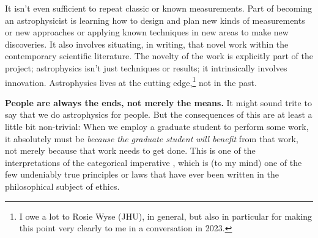 \documentclass{article}
\newcommand{\paragraphskip}{\medskip}
\renewcommand{\paragraph}[1]{\par\paragraphskip\noindent\textbf{#1}}
\begin{document}
It isn't even sufficient to repeat classic or known measurements.
Part of becoming an astrophysicist is learning how to design and plan new kinds of measurements or new approaches or applying known techniques in new areas to make new discoveries.
It also involves situating, in writing, that novel work within the contemporary scientific literature.
The novelty of the work is explicitly part of the project; astrophysics isn't just techniques or results; it intrinsically involves innovation.
Astrophysics lives at the cutting edge,\footnote{%
I owe a lot to Rosie Wyse (JHU), in general, but also in particular for making this point very clearly to me in a conversation in 2023.}
not in the past.

\paragraph{People are always the ends, not merely the means.}
It might sound trite to say that we do astrophysics for people.
But the consequences of this are at least a little bit non-trivial:
When we employ a graduate student to perform some work, it absolutely must be \emph{because the graduate student will benefit} from that work, not merely because that work needs to get done.
This is one of the interpretations of the categorical imperative \cite{kant}, which is (to my mind) one of the few undeniably true principles or laws that have ever been written in the philosophical subject of ethics.
\end{document}
